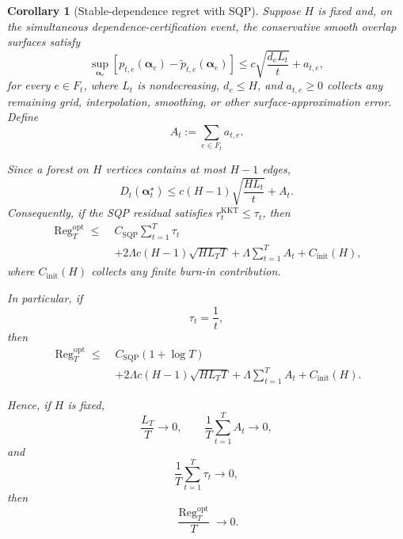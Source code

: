 \documentclass[11pt]{article}
\newtheorem{corollary}{Corollary}
\newcommand{\Reg}{\operatorname{Reg}}
\begin{document}
\begin{corollary}[Stable-dependence regret with SQP]
\label{cor:stable-dependence-sqp}
Suppose $H$ is fixed and, on the simultaneous dependence-certification event,
the conservative smooth overlap surfaces satisfy
\begin{equation}
    \sup_{\bm\alpha_e}
    \left[
        p_{t,e}(\bm\alpha_e)
        -
        \widetilde p_{t,e}(\bm\alpha_e)
    \right]
    \le
    c
    \sqrt{
        \frac{d_eL_t}{t}
    }
    +
    a_{t,e},
    \label{eq:sqp-overlap-gap}
\end{equation}
for every $e\in F_t$, where $L_t$ is nondecreasing, $d_e\le H$, and
$a_{t,e}\ge0$ collects any remaining grid, interpolation, smoothing, or other
surface-approximation error.  Define
\begin{equation}
    A_t
    :=
    \sum_{e\in F_t}a_{t,e}.
    \label{eq:sqp-total-surface-error}
\end{equation}

Since a forest on $H$ vertices contains at most $H-1$ edges,
\begin{equation}
    D_t(\bm\alpha_t^\star)
    \le
    c(H-1)
    \sqrt{
        \frac{HL_t}{t}
    }
    +
    A_t.
    \label{eq:sqp-Dt-bound}
\end{equation}
Consequently, if the SQP residual satisfies
$r_t^{\mathrm{KKT}}\le\tau_t$, then
\begin{equation}
\boxed{
\begin{aligned}
    \Reg_T^{\mathrm{opt}}
    \le\;&
    C_{\mathrm{SQP}}
    \sum_{t=1}^{T}\tau_t
    \\
    &+
    2\Lambda c(H-1)
    \sqrt{
        H L_T T
    }
    +
    \Lambda
    \sum_{t=1}^{T}A_t
    +
    C_{\mathrm{init}}(H),
\end{aligned}
}
\label{eq:stable-sqp-regret}
\end{equation}
where $C_{\mathrm{init}}(H)$ collects any finite burn-in contribution.

In particular, if
\[
    \tau_t=\frac1t,
\]
then
\begin{equation}
\boxed{
\begin{aligned}
    \Reg_T^{\mathrm{opt}}
    \le\;&
    C_{\mathrm{SQP}}(1+\log T)
    \\
    &+
    2\Lambda c(H-1)
    \sqrt{
        H L_T T
    }
    +
    \Lambda
    \sum_{t=1}^{T}A_t
    +
    C_{\mathrm{init}}(H).
\end{aligned}
}
\label{eq:stable-sqp-log-regret}
\end{equation}

Hence, if $H$ is fixed,
\[
    \frac{L_T}{T}\longrightarrow0,
    \qquad
    \frac1T
    \sum_{t=1}^{T}A_t
    \longrightarrow0,
\]
and
\[
    \frac1T
    \sum_{t=1}^{T}\tau_t
    \longrightarrow0,
\]
then
\begin{equation}
\boxed{
    \frac{\Reg_T^{\mathrm{opt}}}{T}
    \longrightarrow
    0.
}
\label{eq:sqp-average-regret-vanishes}
\end{equation}
\end{corollary}
\end{document}
